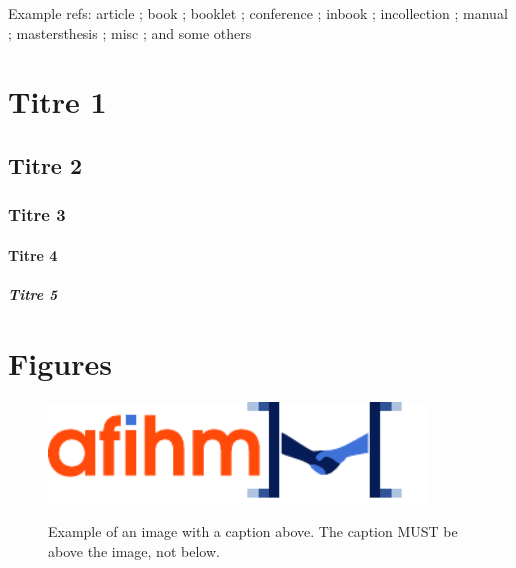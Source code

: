 \documentclass{jips}
\begin{document}
Example refs:
article \citep{article} ;
book \citep{book} ;
booklet \citep{booklet} ;
conference \citep{conference} ;
inbook \citep{inbook} ;
incollection \citep{incollection} ;
manual \citep{manual} ;
mastersthesis \citep{mastersthesis} ;
misc \citep{misc} ;
and some others \citep{phdthesis,proceedings,techreport,unpublished}

\lipsum[1]

\section{Titre 1}

\lipsum[2]

\subsection{Titre 2}

\lipsum[3]

\subsubsection{Titre 3}

\lipsum[4]

\paragraph{Titre 4}

\lipsum[5]

\subparagraph{Titre 5}

\lipsum[6]

\section{Figures}

\lipsum[7]

\begin{figure}[!ht]
    \centering
    \caption{Example of an image with a caption above. The caption MUST be above the image, not below.}
    \includegraphics[width=10cm]{afihm_logo.pdf}
    \label{fig:afihm}
\end{figure}

\lipsum[8]
\end{document}
